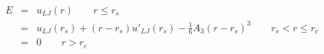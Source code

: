 


\begin{eqnarray*}
 E &=& u_{LJ}(r) \qquad r \leq r_s \\
    &=&  u_{LJ}(r_s) + (r-r_s) u'_{LJ}(r_s) - \frac{1}{6} A_3 (r-r_s)^3 \qquad r_s < r \leq r_c \\
    &=& 0 \qquad r > r_c 
\end{eqnarray*}                           




